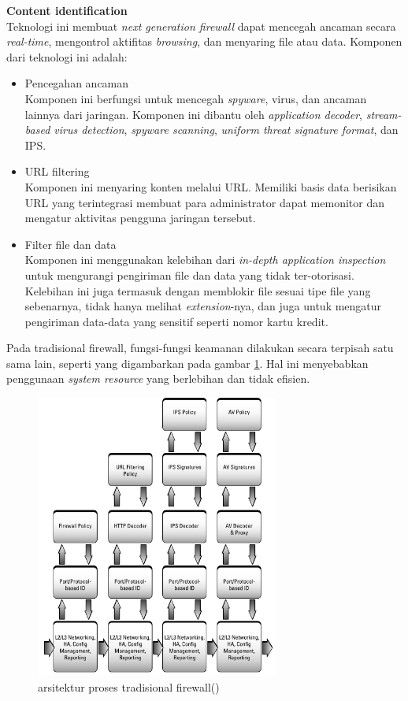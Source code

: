 \noindent\textbf{Content identification}\\
Teknologi ini membuat \textit{next generation firewall} dapat mencegah ancaman secara \textit{real-time}, mengontrol aktifitas \textit{browsing}, dan menyaring file atau data. Komponen dari teknologi ini adalah:
\begin{itemize}
	\item Pencegahan ancaman\\
	Komponen ini berfungsi untuk mencegah \textit{spyware}, virus, dan ancaman lainnya dari jaringan. Komponen ini dibantu oleh \textit{application decoder}, \textit{stream-based virus detection}, \textit{spyware scanning}, \textit{uniform threat signature format}, dan IPS.
	\item URL filtering\\
	Komponen ini menyaring konten melalui URL. Memiliki basis data berisikan URL yang terintegrasi membuat para administrator dapat memonitor dan mengatur aktivitas pengguna jaringan tersebut. 
	\item Filter file dan data\\
	Komponen ini menggunakan kelebihan dari \textit{in-depth application inspection} untuk mengurangi pengiriman file dan data yang tidak ter-otorisasi. Kelebihan ini juga termasuk dengan memblokir file sesuai tipe file yang sebenarnya, tidak hanya melihat \textit{extension}-nya, dan juga untuk mengatur pengiriman data-data yang sensitif seperti nomor kartu kredit. 
\end{itemize}

Pada tradisional firewall, fungsi-fungsi keamanan dilakukan secara terpisah satu sama lain, seperti yang digambarkan pada gambar \ref{fig:architecture_tradisional_firewall}. Hal ini menyebabkan penggunaan \textit{system resource} yang berlebihan dan tidak efisien.
\begin{figure}[H]
	\centering
	\includegraphics[width=8cm]{resources/architecture_tradisional_firewall.png}
	\caption{arsitektur proses tradisional firewall(\cite{miller2011next})}
	\label{fig:architecture_tradisional_firewall}
\end{figure}

